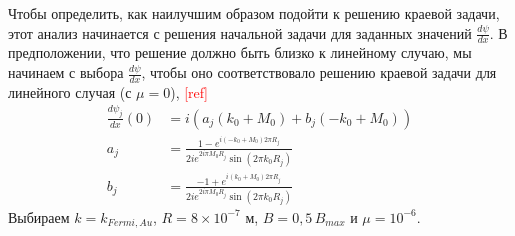 \documentclass[A4,12pt,oneside]{article}
\renewcommand{\(}{\left(}
\renewcommand{\)}{\right)}
\newcommand{\citeph}{\textcolor{red}{[ref] }}
\begin{document}
Чтобы определить, как наилучшим образом подойти к решению краевой задачи, этот анализ начинается с решения начальной задачи для заданных значений $\frac{d\psi}{dx}$. В предположении, что решение должно быть близко к линейному случаю, мы начинаем с выбора $\frac {d\psi}{dx}$, чтобы оно соответствовало решению краевой задачи для линейного случая (с $\mu = 0$), \citeph
\begin{align}\label{eqn:linbvp1}
\frac{d\psi_j}{dx}\left(0\right) &= i \left(a_j \left(k_0 + M_0\right) + b_j \left(-k_0 + M_0\right)\right)\\
a_j &= \frac{1- e^{i\left(-k_0 + M_0\right) 2\pi R_j}}{2 i e^{2 i \pi M_0 R_j} \sin\left(2\pi k_0 R_j\right)}\\
b_j &= \frac{-1 + e^{i\left(k_0 + M_0\right) 2\pi R_j}}{2 i e^{2 i \pi M_0 R_j} \sin\left(2\pi k_0 R_j\right)}\label{eqn:linbvp2}
\end{align}
Выбираем $k = k_ {Fermi, Au}$, $R = 8 \times 10^{-7}$ м, $B = 0,5\, B_{max}$ и $\mu = 10^{-6}$.
\end{document}
